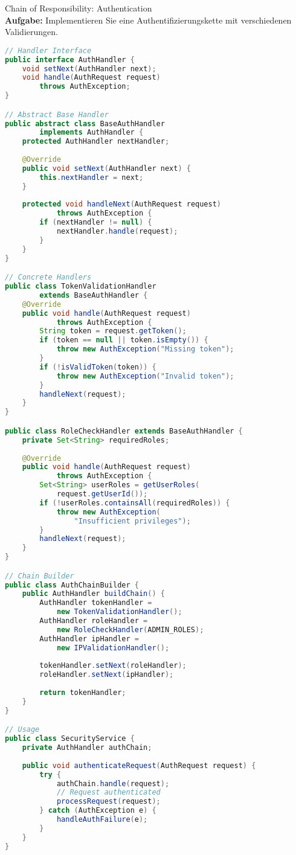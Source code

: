 \begin{example2}{Chain of Responsibility: Authentication}\\
\textbf{Aufgabe:} Implementieren Sie eine Authentifizierungskette mit verschiedenen Validierungen.

\begin{lstlisting}[language=Java, style=basesmol]
// Handler Interface
public interface AuthHandler {
    void setNext(AuthHandler next);
    void handle(AuthRequest request) 
        throws AuthException;
}

// Abstract Base Handler
public abstract class BaseAuthHandler 
        implements AuthHandler {
    protected AuthHandler nextHandler;
    
    @Override
    public void setNext(AuthHandler next) {
        this.nextHandler = next;
    }
    
    protected void handleNext(AuthRequest request) 
            throws AuthException {
        if (nextHandler != null) {
            nextHandler.handle(request);
        }
    }
}

// Concrete Handlers
public class TokenValidationHandler 
        extends BaseAuthHandler {
    @Override
    public void handle(AuthRequest request) 
            throws AuthException {
        String token = request.getToken();
        if (token == null || token.isEmpty()) {
            throw new AuthException("Missing token");
        }
        if (!isValidToken(token)) {
            throw new AuthException("Invalid token");
        }
        handleNext(request);
    }
}

public class RoleCheckHandler extends BaseAuthHandler {
    private Set<String> requiredRoles;
    
    @Override
    public void handle(AuthRequest request) 
            throws AuthException {
        Set<String> userRoles = getUserRoles(
            request.getUserId());
        if (!userRoles.containsAll(requiredRoles)) {
            throw new AuthException(
                "Insufficient privileges");
        }
        handleNext(request);
    }
}

// Chain Builder
public class AuthChainBuilder {
    public AuthHandler buildChain() {
        AuthHandler tokenHandler = 
            new TokenValidationHandler();
        AuthHandler roleHandler = 
            new RoleCheckHandler(ADMIN_ROLES);
        AuthHandler ipHandler = 
            new IPValidationHandler();
            
        tokenHandler.setNext(roleHandler);
        roleHandler.setNext(ipHandler);
        
        return tokenHandler;
    }
}

// Usage
public class SecurityService {
    private AuthHandler authChain;
    
    public void authenticateRequest(AuthRequest request) {
        try {
            authChain.handle(request);
            // Request authenticated
            processRequest(request);
        } catch (AuthException e) {
            handleAuthFailure(e);
        }
    }
}
\end{lstlisting}
\end{example2}

